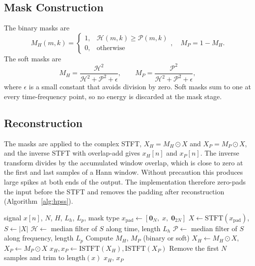 \documentclass[conference]{IEEEtran}
\begin{document}
\subsection{Mask Construction}
The binary masks are
\begin{equation}
M_H(m,k)=\begin{cases}1,&\mathcal{H}(m,k)\ge\mathcal{P}(m,k)\\0,&\text{otherwise}\end{cases},\quad M_P=1-M_H.
\end{equation}
The soft masks are
\begin{equation}
M_H=\frac{\mathcal{H}^{2}}{\mathcal{H}^{2}+\mathcal{P}^{2}+\epsilon},\qquad M_P=\frac{\mathcal{P}^{2}}{\mathcal{H}^{2}+\mathcal{P}^{2}+\epsilon},
\end{equation}
where $\epsilon$ is a small constant that avoids division by zero. Soft masks sum to one at every time-frequency point, so no energy is discarded at the mask stage.

\subsection{Reconstruction}
The masks are applied to the complex STFT, $X_H=M_H\odot X$ and $X_P=M_P\odot X$, and the inverse STFT with overlap-add \cite{griffin1984} gives $x_H[n]$ and $x_P[n]$. The inverse transform divides by the accumulated window overlap, which is close to zero at the first and last samples of a Hann window. Without precaution this produces large spikes at both ends of the output. The implementation therefore zero-pads the input before the STFT and removes the padding after reconstruction (Algorithm~\ref{alg:hpss}).

\begin{algorithm}[t]
\caption{Median-filter HPSS}
\label{alg:hpss}
\begin{algorithmic}[1]
\Require signal $x[n]$, $N$, $H$, $L_h$, $L_p$, mask type
\State $x_{\text{pad}}\gets[\mathbf{0}_N,\;x,\;\mathbf{0}_{2N}]$
\State $X\gets\text{STFT}(x_{\text{pad}})$, $S\gets|X|$
\State $\mathcal{H}\gets$ median filter of $S$ along time, length $L_h$
\State $\mathcal{P}\gets$ median filter of $S$ along frequency, length $L_p$
\State Compute $M_H$, $M_P$ (binary or soft)
\State $X_H\gets M_H\odot X$, $X_P\gets M_P\odot X$
\State $x_H,x_P\gets\text{ISTFT}(X_H),\text{ISTFT}(X_P)$
\State Remove the first $N$ samples and trim to $\text{length}(x)$
\State \Return $x_H,\,x_P$
\end{algorithmic}
\end{algorithm}
\end{document}
